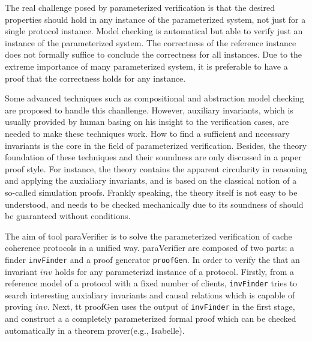 \documentclass{llncs}
\begin{document}
The real challenge posed by parameterized verification is that the
desired properties should hold in any instance of the parameterized
system, not just for a single protocol instance. Model checking is
automatical but able to verify just an instance of the parameterized
 system. The correctness of the reference instance  does
not formally suffice to conclude the correctness for all instances.
Due to the extreme importance of many parameterized system, it is
preferable to have a proof that the correctness holds for any
instance.

Some advanced techniques such as compositional and abstraction model
checking are proposed to handle this chanllenge. However, auxiliary
invariants, which is usually provided by  human basing on his
insight to the verification cases, are needed to make these
techniques work. How to find a sufficient and necessary invariants
is the core in the field of parameterized verification.
Besides, the theory foundation of these techniques and their
soundness are only discussed in a paper proof style. For instance,
the theory contains the apparent circularity in reasoning and
applying the auxialiary invariants, and is based on the classical
notion of a so-called simulation proofs. Frankly speaking, the
theory itself is not easy to be understood, and  needs to be
checked mechanically due to its soundness of should be
guaranteed without conditions.


The aim of tool {\sf paraVerifier} is to solve the parameterized
verification of cache coherence protocols in a unified way. {\sf
paraVerifier} are composed of two parts:  a finder {\tt invFinder}
and a proof generator {\tt proofGen}. In order to verify the that an
invariant $inv$ holds for any parameterizd instance of a protocol.
Firstly,  from a reference model of a protocol with a fixed number
of clients, {\tt invFinder} tries to search
interesting auxialiary invariants and causal relations which is
capable of proving $inv$. Next, {tt proofGen}
 uses the output of {\tt invFinder} in the first stage, and
 construct a a completely parameterized
formal proof which can
be checked automatically in a theorem prover(e.g., Isabelle).
\end{document}
